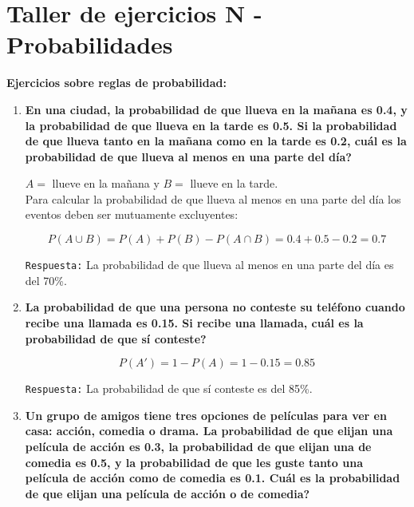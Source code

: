 \documentclass[12pt]{article}
\begin{document}
    

    \section*{\centering  Taller de ejercicios N - Probabilidades} 
    \vspace{0.5cm}\textbf{Ejercicios sobre reglas de probabilidad:} \vspace{0.5cm}

    \begin{enumerate}[label=\textbf{\arabic*.}]
        \item \textbf{En una ciudad, la probabilidad de que llueva en la mañana es 0.4, y la
        probabilidad de que llueva en la tarde es 0.5. Si la probabilidad de que llueva
        tanto en la mañana como en la tarde es 0.2, \textquestiondown cuál es la probabilidad de que
        llueva al menos en una parte del día?}

        $A = $ llueve en la mañana y $B = $ llueve en la tarde.\\

        Para calcular la probabilidad de que llueva al menos en una parte del día 
        los eventos deben ser mutuamente excluyentes:

        \[P(A \cup B) = P(A) + P(B) - P(A \cap B) = 0.4 + 0.5 - 0.2 = 0.7\]

        \texttt{Respuesta:} La probabilidad de que llueva al menos en una parte del día es del 70\%.
        


        \item \textbf{La probabilidad de que una persona no conteste su teléfono cuando recibe una
        llamada es 0.15. Si recibe una llamada, \textquestiondown cuál es la probabilidad de que sí
        conteste?}

        \[P(A') = 1 - P(A) = 1 - 0.15 = 0.85\]

        \texttt{Respuesta:} La probabilidad de que sí conteste es del 85\%.
        


        \item \textbf{Un grupo de amigos tiene tres opciones de películas para ver en casa: acción,
        comedia o drama. La probabilidad de que elijan una película de acción es 0.3, la
        probabilidad de que elijan una de comedia es 0.5, y la probabilidad de que les
        guste tanto una película de acción como de comedia es 0.1. \textquestiondown Cuál es la
        probabilidad de que elijan una película de acción o de comedia?}
        

\end{enumerate}
\end{document}
